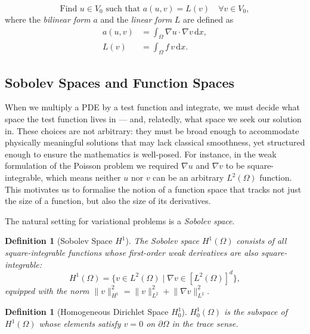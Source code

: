 \documentclass[11pt]{article}
\newtheorem{definition}[theorem]{Definition}
\newcommand{\dx}{\,\mathrm{d}x}
\newcommand{\Grad}{\nabla}
\newcommand{\norm}[1]{\lVert #1 \rVert}
\newcommand{\domain}{\Omega}
\newcommand{\boundary}{\partial\Omega}
\begin{document}
\begin{equation}
  \label{eq:poisson-weak}
  \text{Find } u \in V_0 \text{ such that }
  a(u, v) = L(v) \quad \forall v \in V_0,
\end{equation}
where the \emph{bilinear form} $a$ and the \emph{linear form} $L$ are defined
as
\begin{align}
  a(u, v) &= \int_\domain \Grad u \cdot \Grad v \dx, \label{eq:bilinear}\\
  L(v)    &= \int_\domain f\, v \dx.               \label{eq:linear}
\end{align}

\subsection{Sobolev Spaces and Function Spaces}

When we multiply a PDE by a test function and integrate, we must decide what
space the test function lives in --- and, relatedly, what space we seek our
solution in. These choices are not arbitrary: they must be broad enough to
accommodate physically meaningful solutions that may lack classical smoothness,
yet structured enough to ensure the mathematics is well-posed. For instance, in
the weak formulation of the Poisson problem we required $\nabla u$ and $\nabla
v$ to be square-integrable, which means neither $u$ nor $v$ can be an arbitrary
$L^2(\domain)$ function. This motivates us to formalise the notion of a
function space that tracks not just the size of a function, but also the size of its derivatives.

The natural setting for variational problems is a \emph{Sobolev space}.
\begin{definition}[Sobolev Space $H^1$]
The Sobolev space $H^1(\domain)$ consists of all square-integrable functions
whose first-order weak derivatives are also square-integrable:
\begin{equation*}
  H^1(\domain) = \bigl\{ v \in L^2(\domain)
    \mid \nabla v \in [L^2(\domain)]^d \bigr\},
\end{equation*}
equipped with the norm
$\norm{v}_{H^1}^2 = \norm{v}_{L^2}^2 + \norm{\nabla v}_{L^2}^2$.
\end{definition}

\begin{definition}[Homogeneous Dirichlet Space $H^1_0$]
\label{def:H10}
$H^1_0(\domain)$ is the subspace of $H^1(\domain)$ whose elements satisfy
$v = 0$ on $\boundary$ in the trace sense.
\end{definition}
\end{document}
